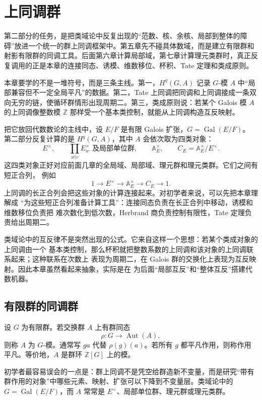 \documentclass[11pt,a4paper,openany]{ctexbook}
\numberwithin{equation}{chapter}
\newcommand{\Z}{\mathbb{Z}}
\newcommand{\A}{\mathbb{A}}
\theoremstyle{plain}
\theoremstyle{definition}
\theoremstyle{remark}
\begin{document}
 \chapter{上同调群}

第二部分的任务，是把类域论中反复出现的“范数、核、余核、局部到整体的障碍”放进一个统一的群上同调框架中。第五章先不碰具体数域，而是建立有限群和射影有限群的同调工具。后面第六章计算局部域，第七章计算理元类群时，真正反复调用的正是本章的连接同态、诱模、维数移位、杯积、Tate 定理和类成原则。

本章要学的不是一堆符号，而是三条主线。第一，$H^q(G,A)$ 记录 $G$-模 $A$ 中“局部兼容但不一定全局平凡”的数据。第二，Tate 上同调把同调和上同调接成一条双向无穷的链，使循环群情形出现周期二。第三，类成原则说：若某个 Galois 模 $A$ 的上同调像整数模 $\Z$ 那样受一个基本类控制，就能从上同调构造互反映射。

把它放回代数数论的主线中，设 $E/F$ 是有限 Galois 扩张，$G=\operatorname{Gal}(E/F)$。
第二部分反复计算的是 $H^q(G,A)$，其中 $A$ 会依次取为四类对象：
\[
E^\times,\qquad
\prod_{w|v}E_w^\times\text{ 及局部单位群},\qquad
\A_E^\times,\qquad
C_E=\A_E^\times/E^\times .
\]
这四类对象正好对应前面几章的全局域、局部域、理元群和理元类群。它们之间有短正合列，
例如
\[
1\longrightarrow E^\times\longrightarrow \A_E^\times\longrightarrow C_E\longrightarrow1.
\]
上同调的长正合列会把这些对象的计算连接起来。对初学者来说，可以先把本章理解成
“为这些短正合列准备计算工具”：连接同态负责在长正合列中移动，诱模和维数移位负责把
难次数化到低次数，Herbrand 商负责控制有限性，Tate 定理负责给出周期二。

类域论中的互反律不是突然出现的公式。它来自这样一个思想：若某个类成对象的上同调由一个
基本类控制，那么杯积就把整数系数的上同调和该对象的上同调联系起来；这种联系在次数上
表现为周期二，在 Galois 群的交换化上表现为互反映射。因此本章虽然看起来抽象，实际是在
为后面“局部互反”和“整体互反”搭建代数机器。

\section{有限群的同调群}

设 $G$ 为有限群。若交换群 $A$ 上有群同态
\[
 \rho:G\longrightarrow \operatorname{Aut}(A),
\]
则称 $A$ 为 $G$-模。通常写 $ga$ 代替 $\rho(g)(a)$。若所有 $g$ 都平凡作用，则称作用平凡。等价地，$A$ 是群环 $\Z[G]$ 上的模。

初学者最容易误会的一点是：群上同调不是凭空给群造新不变量，而是研究“带有群作用的对象”中哪些元素、映射、扩张可以下降到不变量层。类域论中的 $G=\operatorname{Gal}(E/F)$，而 $A$ 常常是 $E^\times$、局部单位群、理元群或理元类群。
\end{document}
